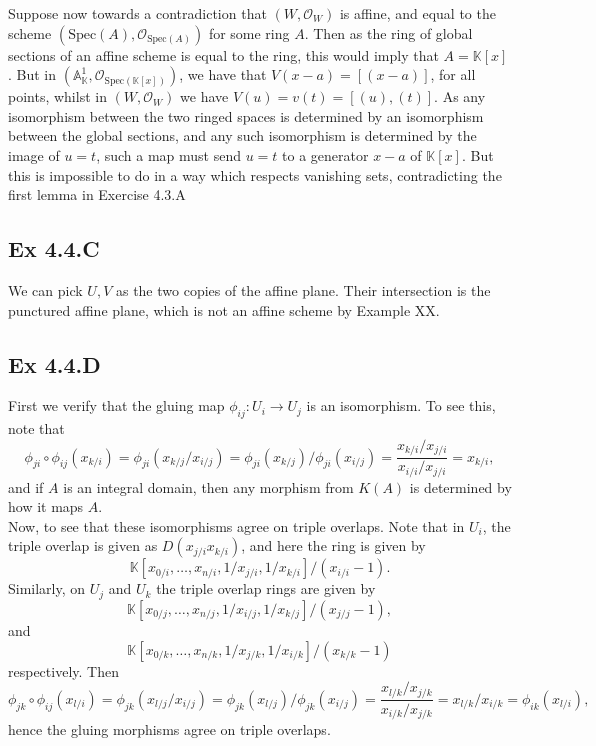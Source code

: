 \documentclass{article}
\theoremstyle{definition}
\newcommand{\K}{\mathbb{K}}
\newcommand{\A}{\mathbb{A}}
\newcommand{\oo}{\mathcal{O}}
\newcommand{\osp}[1]{\oo_{\Spec\left(#1\right)}}
\renewcommand{\AA}[1]{\A^{#1}}
\newcommand{\Spec}{\text{Spec}}
\begin{document}
Suppose now towards a contradiction that $(W, \oo_W)$ is affine, and equal to
the scheme $(\Spec(A), \osp{A})$ for some ring $A$. Then as the ring of global
sections of an affine scheme is equal to the ring, this would imply that $A =
\K[x]$. But in $(\AA{1}_{\K}, \osp{\K[x]})$, we have that $V(x - a) = [(x -
a)]$, for all points, whilst in $(W, \oo_W)$ we have $V(u) = v(t) = [(u),
(t)]$. As any isomorphism between the two ringed spaces is determined by an
isomorphism between the global sections, and any such isomorphism is determined
by the image of $u = t$, such a map must send $u = t$ to a generator $x - a$ of
$\K[x]$. But this is impossible to do in a way which respects vanishing sets,
contradicting the first lemma in Exercise 4.3.A

\subsection*{Ex 4.4.C}

We can pick $U, V$ as the two copies of the affine plane. Their intersection is
the punctured affine plane, which is not an affine scheme by Example XX.

\subsection*{Ex 4.4.D}

First we verify that the gluing map $\phi_{ij} : U_i \to U_j$ is an isomorphism.
To see this, note that
\[
	\phi_{ji} \circ \phi_{ij} (x_{k/i})
	=
	\phi_{ji}(x_{k/j}/x_{i/j})
	=
	\phi_{ji}(x_{k/j})/\phi_{ji}(x_{i/j})
	=
	\frac{x_{k/i}/x_{j/i}}{x_{i/i}/x_{j/i}}
	=
	x_{k/i},
\]
and if $A$ is an integral domain, then any morphism from $K(A)$ is determined
by how it maps $A$. \\

Now, to see that these isomorphisms agree on triple overlaps. Note that 
in $U_i$, the triple overlap is given as $D(x_{j/i}x_{k/i})$,
and here the ring is given by
\[
	\K[x_{0/i}, \ldots, x_{n/i}, 1/x_{j/i}, 1/x_{k/i}]/(x_{i/i} - 1).
\]
Similarly, on $U_j$ and $U_k$ the triple overlap rings are given by
\[
	\K[x_{0/j}, \ldots, x_{n/j}, 1/x_{i/j}, 1/x_{k/j}]/(x_{j/j} - 1),
\]
and
\[
	\K[x_{0/k}, \ldots, x_{n/k}, 1/x_{j/k}, 1/x_{i/k}]/(x_{k/k} - 1)
\]
respectively. Then
\[
	\phi_{jk} \circ \phi_{ij} (x_{l/i})
	=
	\phi_{jk}(x_{l/j}/x_{i/j})
	=
	\phi_{jk}(x_{l/j})/\phi_{jk}(x_{i/j})
	=
	\frac{x_{l/k}/x_{j/k}}{x_{i/k}/x_{j/k}}
	=
	x_{l/k}/x_{i/k}
	=
	\phi_{ik}(x_{l/i}),
\]
hence the gluing morphisms agree on triple overlaps.
\end{document}
